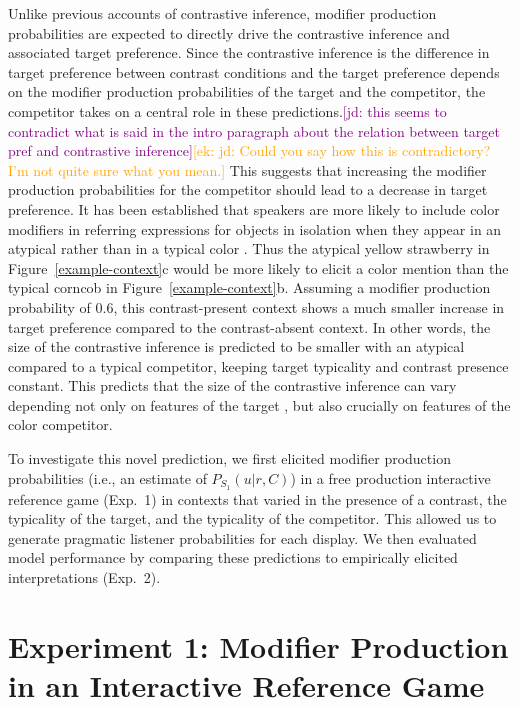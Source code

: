\documentclass[10pt,letterpaper]{article}
\newcommand{\ek}[1]{\textcolor{Orange}{[ek: #1]}}
\newcommand{\jd}[1]{\textcolor{Purple}{[jd: #1]}}
\begin{document}
Unlike previous accounts of contrastive inference, modifier production probabilities are expected to directly drive the contrastive inference and associated target preference. Since the contrastive inference is the difference in target preference between contrast conditions and the target preference depends on the modifier production probabilities of the target and the competitor, the competitor takes on a central role in these predictions.\jd{this seems to contradict what is said in the intro paragraph about the relation between target pref and contrastive inference}\ek{jd: Could you say how this is contradictory? I'm not quite sure what you mean.} This suggests that increasing the modifier production probabilities for the competitor should lead to a decrease in target preference. It has been established that speakers are more likely to include color modifiers in referring expressions for objects in isolation when they appear in an atypical rather than in a typical color \cite{Rubio-Fernandez:2016,Westerbeek:2015,Degen:inpress}. Thus the atypical yellow strawberry in Figure~\ref{example-context}c would be more likely to elicit a color mention than the typical corncob in Figure~\ref{example-context}b. Assuming a modifier production probability of 0.6, this contrast-present context shows a much smaller increase in target preference compared to the contrast-absent context. In other words, the size of the contrastive inference is predicted to be smaller with an atypical compared to a typical competitor, keeping target typicality and contrast presence constant. This predicts that the size of the contrastive inference can vary depending not only on features of the target \cite<as previously shown by>{Sedivy:2003, Rubio-Fernandez:2019}, but also crucially on features of the color competitor. 


To investigate this novel prediction, we first elicited modifier production probabilities (i.e., an estimate of $P_{S_1}(u|r,C)$) in a free production interactive reference game (Exp.~1) in contexts that varied in the presence of a contrast, the typicality of the target, and the typicality of the competitor. This allowed us to generate pragmatic listener probabilities for each display. We then evaluated model performance by comparing these predictions to empirically elicited interpretations (Exp.~2).


\section{Experiment 1: Modifier Production in an Interactive Reference Game}
\end{document}
